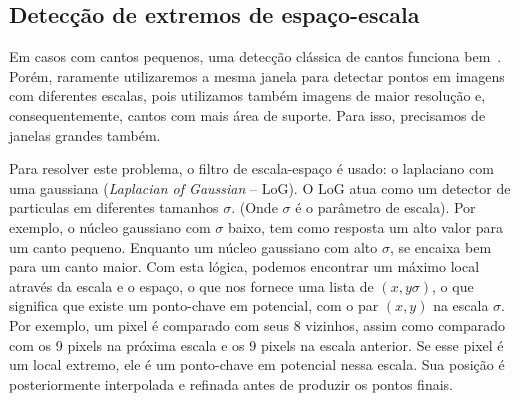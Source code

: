 \subsection{Detecção de extremos de espaço-escala}\label{DiffGaussian}


Em casos com cantos pequenos, uma detecção clássica de cantos funciona
bem~\cite{Harris:Stephens:Edge:Corner}. Porém, raramente
utilizaremos a mesma janela para detectar pontos em imagens com
diferentes escalas, pois utilizamos também imagens de maior resolução e, consequentemente, cantos
com mais área de suporte. Para isso, precisamos de janelas grandes também. 

Para resolver este problema, o filtro de escala-espaço é usado: o laplaciano
com uma gaussiana (\emph{Laplacian of Gaussian} --  LoG). O LoG atua como um detector de
particulas em diferentes tamanhos $\sigma$. (Onde $\sigma$ é o parâmetro de
escala). Por exemplo, o núcleo gaussiano com $\sigma$ baixo, tem como resposta
um alto valor para um canto pequeno. Enquanto um núcleo gaussiano com alto
$\sigma$, se encaixa bem para um canto maior. Com esta lógica, podemos encontrar
um máximo local através da escala e o espaço, o que nos fornece uma lista de
$(x,y \sigma)$, o que significa que existe um ponto-chave em potencial, com o
par $(x,y)$ na escala $\sigma$.  Por exemplo, um pixel é comparado com seus 8 vizinhos, assim
como comparado com os 9 pixels na próxima escala e os 9 pixels na escala
anterior. Se esse pixel é um local extremo, ele é um ponto-chave em potencial
nessa escala. Sua posição é posteriormente interpolada e refinada antes de
produzir os pontos finais.



